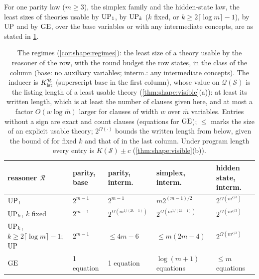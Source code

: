 \begin{corollary}\label{cor:shape:regimes}
For one parity law ($m\ge3$), the simplex family and the hidden-state law, the least sizes of theories usable by $\mathrm{UP}_1$, by $\mathrm{UP}_k$ ($k$ fixed, or $k\ge2\lceil\log m\rceil-1$), by $\mathrm{UP}$ and by $\mathrm{GE}$, over the base variables or with any intermediate concepts, are as stated in \cref{tab:shape:regimes}.
\end{corollary}

\begin{table}[t]
\centering\small\crefabbrev
\renewcommand{\arraystretch}{1.15}
\begin{tabular}{@{}lllll@{}}
\toprule
reasoner $\mathcal R$ & parity, base & parity, interm. & simplex, interm. & hidden state, interm.\\
\midrule
$\mathrm{UP}_1$ & $2^{m-1}$ & $2^{m-1}$ & $m2^{(m-1)/2}$ & $2^{\Omega(m^{\varepsilon/3})}$\\
$\mathrm{UP}_k$, $k$ fixed & $2^{m-1}$ & $2^{\Omega(m^{1/(2k-1)})}$ & $2^{\Omega(m^{1/(2k-1)})}$ & $2^{\Omega(m^{\varepsilon/3})}$\\
$\mathrm{UP}_k$, $k\ge2\lceil\log m\rceil-1$; $\mathrm{UP}$ & $2^{m-1}$ & ${}\le4m-6$ & ${}\le m(2m-4)$ & $2^{\Omega(m^{\varepsilon/3})}$\\
$\mathrm{GE}$ & 1 equation & 1 equation & $\log(m+1)$ equations & ${}\le m$ equations\\
\bottomrule
\end{tabular}
\caption{The regimes (\cref{cor:shape:regimes}): the least size of a theory usable by the reasoner of the row, with the round budget the row states, in the class of the column (base: no auxiliary variables; interm.: any intermediate concepts). The inducer is $K_{\mathrm{lst}}^{\mathcal R}$ (superscript $\mathrm{base}$ in the first column), whose value on $\mathcal Q(\mathcal S)$ is the listing length of a least usable theory (\cref{thm:shape:visible}(a)): at least its written length, which is at least the number of clauses given here, and at most a factor $O(w\log\bar m)$ larger for clauses of width $w$ over $\bar m$ variables. Entries without a sign are exact and count clauses (equations for $\mathrm{GE}$); ${}\le$ marks the size of an explicit usable theory; $2^{\Omega(\cdot)}$ bounds the written length from below, given the bound of \citet{hastad1986almost} for fixed $k$ and that of \citet{goos2019adventures} in the last column. Under program length every entry is $K(\mathcal S)\pm c$ (\cref{thm:shape:visible}(b)).}
\label{tab:shape:regimes}
\end{table}

